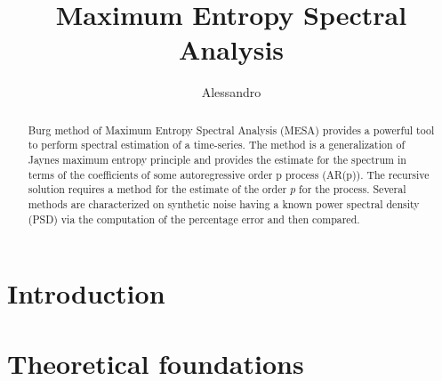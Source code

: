 \documentclass[twocolumn,showpacs,preprintnumbers,nofootinbib,prd,
superscriptaddress,10pt]{revtex4-1}
\begin{document}
\begin{abstract}
Burg method of Maximum Entropy Spectral Analysis (MESA) provides a powerful tool to perform spectral estimation of a time-series. The method is a generalization of Jaynes maximum entropy principle and provides the estimate for the spectrum in terms of the coefficients of some autoregressive order p process (AR(p)). The recursive solution requires a method for the estimate of the order $p$ for the process. Several methods are characterized on synthetic noise having a known power spectral density (PSD) via the computation of the percentage error and then compared.  

\end{abstract}
	
	\title{Maximum Entropy Spectral Analysis}
	\author{Alessandro }
  
	
	\maketitle
	\tableofcontents


\section{Introduction}
\blindtext

\section{Theoretical foundations}
\end{document}
